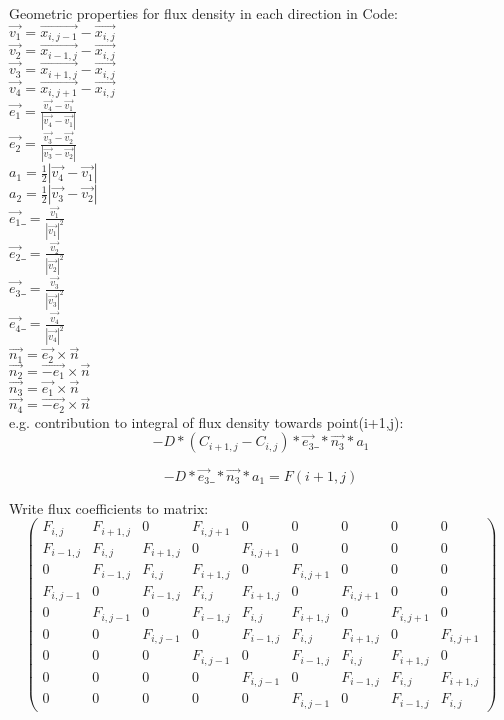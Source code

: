 Geometric properties for flux density in each direction in Code:\\
$\vec{v_1}=\vec{x_{i,j-1}} - \vec{x_{i,j}}$\\
$\vec{v_2}=\vec{x_{i-1,j}} - \vec{x_{i,j}}$\\
$\vec{v_3}=\vec{x_{i+1,j}} - \vec{x_{i,j}}$\\
$\vec{v_4}=\vec{x_{i,j+1}} - \vec{x_{i,j}}$\\
$\vec{e_1}=\frac{\vec{v_4} - \vec{v_1}}{|\vec{v_4} - \vec{v_1}|}$\\
$\vec{e_2}=\frac{\vec{v_3} - \vec{v_2}}{|\vec{v_3} - \vec{v_2}|}$\\
$a_1=\frac{1}{2}{|\vec{v_4} - \vec{v_1}|}$\\
$a_2=\frac{1}{2}{|\vec{v_3} - \vec{v_2}|}$\\
$\vec{e_1}\_=\frac{\vec{v_1}}{|\vec{v_1}|^2}$\\
$\vec{e_2}\_=\frac{\vec{v_2}}{|\vec{v_2}|^2}$\\
$\vec{e_3}\_=\frac{\vec{v_3}}{|\vec{v_3}|^2}$\\
$\vec{e_4}\_=\frac{\vec{v_4}}{|\vec{v_4}|^2}$\\
$\vec{n_1}=\vec{e_2}\times\vec{n}$\\
$\vec{n_2}=\vec{-e_1}\times\vec{n}$\\
$\vec{n_3}=\vec{e_1}\times\vec{n}$\\
$\vec{n_4}=\vec{-e_2}\times\vec{n}$\\

e.g. contribution to integral of flux density towards point(i+1,j):
\begin{equation}
-D*(C_{i+1,j} - C_{i,j})*\vec{e_3}\_*\vec{n_3}*a_1
\end{equation}

\begin{equation}
-D*\vec{e_3}\_*\vec{n_3}*a_1 = F(i+1,j)
\end{equation}

Write flux coefficients to matrix:
\[ \left( \begin{array}{ccccccccc}
F_{i,j} & F_{i+1,j} & 0 & F_{i,j+1} & 0 & 0 & 0 & 0 & 0\\
F_{i-1,j} & F_{i,j} & F_{i+1,j} & 0 & F_{i,j+1} & 0 & 0 & 0 & 0 \\
0 & F_{i-1,j} & F_{i,j} & F_{i+1,j} & 0 & F_{i,j+1} & 0 & 0 & 0\\
F_{i,j-1} & 0 & F_{i-1,j} & F_{i,j} & F_{i+1,j} & 0 & F_{i,j+1} & 0 & 0\\
0 & F_{i,j-1} & 0 & F_{i-1,j} & F_{i,j} & F_{i+1,j} & 0 & F_{i,j+1} & 0\\
0 & 0 & F_{i,j-1} & 0 & F_{i-1,j} & F_{i,j} & F_{i+1,j} & 0 & F_{i,j+1}\\
0 & 0 & 0 & F_{i,j-1} & 0 & F_{i-1,j} & F_{i,j} & F_{i+1,j} & 0\\
0 & 0 & 0 & 0 & F_{i,j-1} & 0 & F_{i-1,j} & F_{i,j} & F_{i+1,j}\\
0 & 0 & 0 & 0 & 0 & F_{i,j-1} & 0 & F_{i-1,j} & F_{i,j}\end{array} \right)\]

